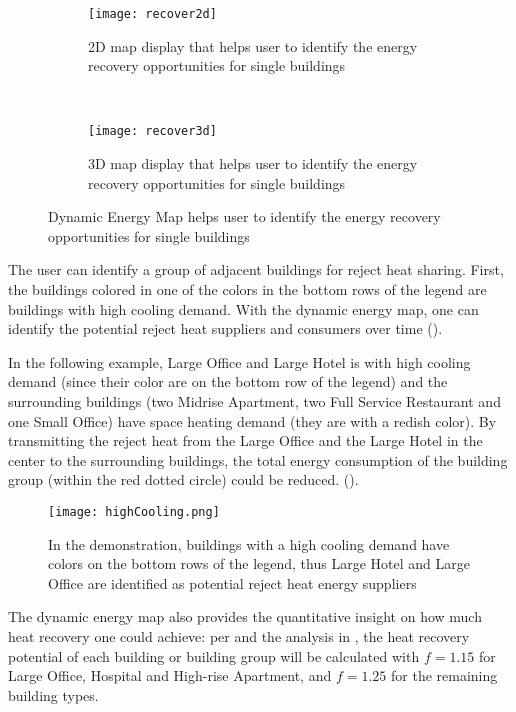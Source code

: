 \begin{figure}[h!]
  \centering
  \begin{subfigure}{0.7\textwidth}
  \centering
  \texttt{[image: recover2d]}
  \caption[Energy Recovery Single Building, 2D]{2D map display that
    helps user to identify the energy recovery opportunities for
    single buildings}
  \label{fig:recover2d}
\end{subfigure}
~
\begin{subfigure}{0.7\textwidth}
  \centering
  \texttt{[image: recover3d]}
  \caption[Energy Recovery Single Building, 3D]{3D map display that
    helps user to identify the energy recovery opportunities for
    single buildings}
  \label{fig:recover3d}
\end{subfigure}
\caption[Single Building Energy Recovery]{Dynamic Energy Map helps
  user to identify the energy recovery opportunities for single
  buildings}
\label{fig:recoverSig}
\end{figure}

The user can identify a group of adjacent buildings for reject heat
sharing. First, the buildings colored in one of the colors in the
bottom rows of the legend are buildings with high cooling demand. With
the dynamic energy map, one can identify the potential reject heat
suppliers and consumers over time ().

In the following example, Large Office and Large Hotel is with high
cooling demand (since their color are on the bottom row of the legend)
and the surrounding buildings (two Midrise Apartment, two Full Service
Restaurant and one Small Office) have space heating demand (they are
with a redish color). By transmitting the reject heat from the Large
Office and the Large Hotel in the center to the surrounding buildings,
the total energy consumption of the building group (within the red
dotted circle) could be reduced. 
().

\begin{figure}[h!]
  \centering
  \texttt{[image: highCooling.png]}
  \caption[Identify Buildings with High Cooling Demand]{In the
    demonstration, buildings with a high cooling demand have colors on
    the bottom rows of the legend, thus Large Hotel and Large Office
    are identified as potential reject heat energy suppliers}
  \label{fig:highCooling}
\end{figure}

The dynamic energy map also provides the quantitative insight on how
much heat recovery one could achieve: per  and the
analysis in , the heat recovery potential of
each building or building group will be calculated with $f = 1.15$ for
Large Office, Hospital and High-rise Apartment, and $f = 1.25$ for the
remaining building types. 

